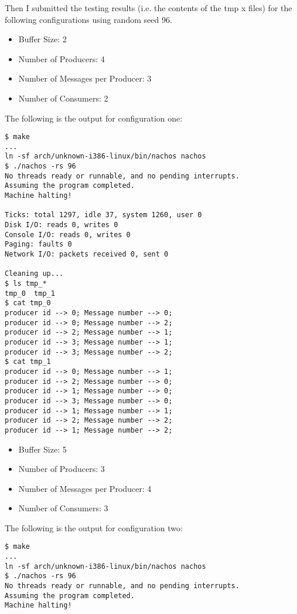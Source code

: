 \documentclass[11pt]{article}
\begin{document}
\begin{question}

    Then I submitted the testing results (i.e. the contents of the tmp x files) for the following configurations using random seed 96.

    \begin{itemize}
        \item{Buffer Size: 2}
        \item{Number of Producers: 4}
        \item{Number of Messages per Producer: 3}
        \item{Number of Consumers: 2}
    \end{itemize}

    The following is the output for configuration one:

    \begin{verbatim}
$ make
...
ln -sf arch/unknown-i386-linux/bin/nachos nachos
$ ./nachos -rs 96
No threads ready or runnable, and no pending interrupts.
Assuming the program completed.
Machine halting!

Ticks: total 1297, idle 37, system 1260, user 0
Disk I/O: reads 0, writes 0
Console I/O: reads 0, writes 0
Paging: faults 0
Network I/O: packets received 0, sent 0

Cleaning up...
$ ls tmp_*
tmp_0  tmp_1
$ cat tmp_0
producer id --> 0; Message number --> 0;
producer id --> 0; Message number --> 2;
producer id --> 2; Message number --> 1;
producer id --> 3; Message number --> 1;
producer id --> 3; Message number --> 2;
$ cat tmp_1
producer id --> 0; Message number --> 1;
producer id --> 2; Message number --> 0;
producer id --> 1; Message number --> 0;
producer id --> 3; Message number --> 0;
producer id --> 1; Message number --> 1;
producer id --> 2; Message number --> 2;
producer id --> 1; Message number --> 2;
    \end{verbatim}

    \begin{itemize}
        \item{Buffer Size: 5}
        \item{Number of Producers: 3}
        \item{Number of Messages per Producer: 4}
        \item{Number of Consumers: 3}
    \end{itemize}

    The following is the output for configuration two:

    \begin{verbatim}
$ make
...
ln -sf arch/unknown-i386-linux/bin/nachos nachos
$ ./nachos -rs 96
No threads ready or runnable, and no pending interrupts.
Assuming the program completed.
Machine halting!


\end{verbatim}
\end{question}
\end{document}
